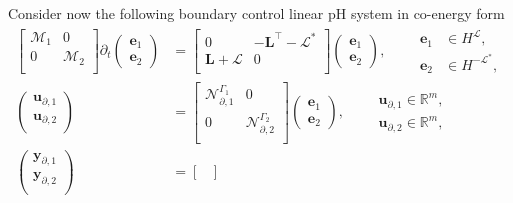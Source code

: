 Consider now the following boundary control linear pH system in co-energy form 
\begin{subequations}
	\label{eq:pHlinsys_mixed}
\begin{align}
\begin{bmatrix}
\mathcal{M}_1 & 0 \\
0 & \mathcal{M}_2 \\
\end{bmatrix}
\partial_t \begin{pmatrix}
\bm{e}_1 \\ \bm{e}_2
\end{pmatrix} &= \begin{bmatrix}
0 & -\bm{L}^\top - \mathcal{L}^* \\
\bm{L} + \mathcal{L} & 0 \\
\end{bmatrix}\begin{pmatrix}
\bm{e}_1 \\ \bm{e}_2
\end{pmatrix} , \qquad \begin{aligned}
\bm{e}_1 &\in H^{\mathcal{L}}, 	\\
\bm{e}_2 &\in H^{-\mathcal{L}^*},
\end{aligned} \label{eq:pHlinsys_dyn_mixed}\\
\begin{pmatrix}
\bm{u}_{\partial, 1}\\
\bm{u}_{\partial, 2}\\
\end{pmatrix} &= \begin{bmatrix}
\mathcal{N}_{\partial, 1}^{\Gamma_1} & 0\\
0 & \mathcal{N}_{\partial, 2}^{\Gamma_2} \\
\end{bmatrix} \begin{pmatrix}
\bm{e}_1 \\ \bm{e}_2
\end{pmatrix}, \qquad 
\begin{aligned}
\bm{u}_{\partial, 1} \in \mathbb{R}^{m},\\
\bm{u}_{\partial, 2} \in \mathbb{R}^{m},
\end{aligned} \\
\begin{pmatrix}
\bm{y}_{\partial, 1}\\
\bm{y}_{\partial, 2}\\
\end{pmatrix} &= \begin{bmatrix}

\end{bmatrix}
\end{align}
\end{subequations}

